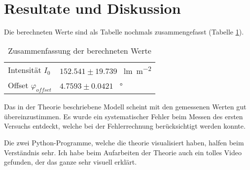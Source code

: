 \section{Resultate und Diskussion}

Die  berechneten  Werte  sind  als  Tabelle  nochmals  zusammengefasst  (Tabelle
\ref{tab:zusammenfassung}).

\begin{table}[ht!]
    \begin{center}
        \caption{Zusammenfassung der berechneten Werte}
        \label{tab:zusammenfassung}
        \begin{tabular}{ll}
            \toprule
            \midrule
            Intensit\"at $I_0$        & $152.541 \pm 19.739$ \SI{}{\lumen\per\square\meter} \\
            Offset $\varphi_{offset}$ & $4.7593  \pm 0.0421$ \SI{}{\degree} \\
            \bottomrule
        \end{tabular}
    \end{center}
\end{table}

Das in  der  Theorie  beschriebene  Modell scheint mit den gemessenen Werten gut
\"ubereinzustimmen. Es wurde ein systematischer  Fehler  beim  Messen des ersten
Versuchs entdeckt, welche bei der Fehlerrechnung ber\"ucksichtigt werden konnte.

Die zwei Python-Programme, welche  die  theorie  visualisiert haben, halfen beim
Verst\"andnis sehr. Ich habe beim Aufarbeiten  der Theorie auch ein tolles Video
gefunden, der das ganze sehr visuell erkl\"art.\cite{ref:polarisation-video}

